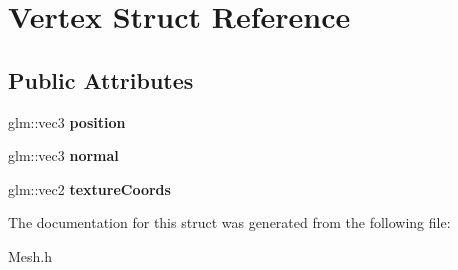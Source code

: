 \hypertarget{struct_vertex}{}\section{Vertex Struct Reference}
\label{struct_vertex}
\subsection*{Public Attributes}
\begin{DoxyCompactItemize}
\item 
\mbox{\label{struct_vertex_a030819fdc241743bbd3e180a6b132ed3}} 
glm\+::vec3 {\bfseries position}
\item 
\mbox{\label{struct_vertex_a3aa35fe84025ecf1acccb5f65f5577fd}} 
glm\+::vec3 {\bfseries normal}
\item 
\mbox{\label{struct_vertex_a03ba1fdd25400383cd40bd2153d08ef1}} 
glm\+::vec2 {\bfseries texture\+Coords}
\end{DoxyCompactItemize}


The documentation for this struct was generated from the following file\+:\begin{DoxyCompactItemize}
\item 
Mesh.\+h\end{DoxyCompactItemize}
